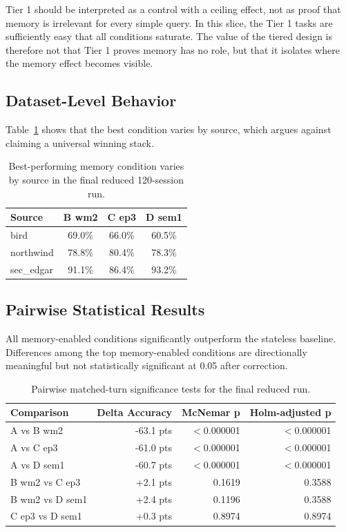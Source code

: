 \documentclass[11pt]{article}
\begin{document}
Tier 1 should be interpreted as a control with a ceiling effect, not as proof that memory is irrelevant for every simple query. In this slice, the Tier 1 tasks are sufficiently easy that all conditions saturate. The value of the tiered design is therefore not that Tier 1 proves memory has no role, but that it isolates where the memory effect becomes visible.

\subsection{Dataset-Level Behavior}
Table~\ref{tab:source} shows that the best condition varies by source, which argues against claiming a universal winning stack.

\begin{table}[ht]
\centering
\begin{tabular}{lccc}
\toprule
Source & B wm2 & C ep3 & D sem1 \\
\midrule
bird & 69.0\% & 66.0\% & 60.5\% \\
northwind & 78.8\% & 80.4\% & 78.3\% \\
sec\_edgar & 91.1\% & 86.4\% & 93.2\% \\
\bottomrule
\end{tabular}
\caption{Best-performing memory condition varies by source in the final reduced 120-session run.}
\label{tab:source}
\end{table}

\subsection{Pairwise Statistical Results}
All memory-enabled conditions significantly outperform the stateless baseline. Differences among the top memory-enabled conditions are directionally meaningful but not statistically significant at 0.05 after correction.

\begin{table}[ht]
\centering
\begin{tabular}{lrrr}
\toprule
Comparison & Delta Accuracy & McNemar p & Holm-adjusted p \\
\midrule
A vs B wm2 & -63.1 pts & $<$0.000001 & $<$0.000001 \\
A vs C ep3 & -61.0 pts & $<$0.000001 & $<$0.000001 \\
A vs D sem1 & -60.7 pts & $<$0.000001 & $<$0.000001 \\
B wm2 vs C ep3 & +2.1 pts & 0.1619 & 0.3588 \\
B wm2 vs D sem1 & +2.4 pts & 0.1196 & 0.3588 \\
C ep3 vs D sem1 & +0.3 pts & 0.8974 & 0.8974 \\
\bottomrule
\end{tabular}
\caption{Pairwise matched-turn significance tests for the final reduced run.}
\label{tab:pairwise}
\end{table}
\end{document}

